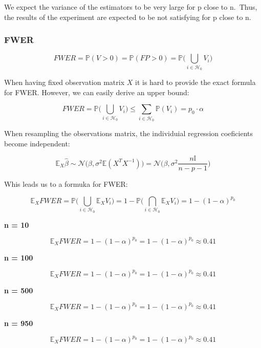 \documentclass[
]{article}
\begin{document}
We expect the variance of the estimators to be very large for p close to
n.~Thus, the results of the experiment are expected to be not satisfying
for p close to n.

\hypertarget{fwer-1}{%
\subsubsection{FWER}\label{fwer-1}}

\[FWER = \mathbb P (V > 0) = \mathbb P (FP > 0) = \mathbb P \Big(\bigcup_{i \in \mathcal H_0} V_i \Big)\]

When having fixed observation matrix \(X\) it is hard to provide the
exact formula for FWER. However, we can easily derive an upper bound:

\[FWER = \mathbb P \Big(\bigcup_{i \in \mathcal H_0} V_i \Big) \leq \sum_{i \in \mathcal H_0} \mathbb P(V_i) = p_0 \cdot \alpha\]

When resampling the observations matrix, the individuial regression
coeficients become independent:

\[\mathbb E_X \hat \beta \sim \mathcal N \big(\beta, \sigma^2 \mathbb E (X^TX^{-1})\big) = \mathcal N \big(\beta, \sigma^2 \frac {n\mathbb I}{n - p  - 1}\big) \]

Whis leads us to a formuka for FWER:

\[\mathbb E_X FWER = \mathbb P \Big(\bigcup_{i \in \mathcal H_0} \mathbb E _XV_i \Big) = 1 - \mathbb P \Big(\bigcap_{i \in \mathcal H_0} \mathbb E _XV_i \Big) = 1 - (1 - \alpha)^{p_0}\]

\textbf{n = 10}

\begin{displaymath} 
 \mathbb E_X FWER = 1 - (1 - \alpha)^{p_0} = 1 - (1 - \alpha)^{p_0} \approx 0.41
\end{displaymath}

\textbf{n = 100}

\begin{displaymath} 
 \mathbb E_X FWER = 1 - (1 - \alpha)^{p_0} = 1 - (1 - \alpha)^{p_0} \approx 0.41
\end{displaymath}

\textbf{n = 500}

\begin{displaymath} 
 \mathbb E_X FWER = 1 - (1 - \alpha)^{p_0} = 1 - (1 - \alpha)^{p_0} \approx 0.41
\end{displaymath}

\textbf{n = 950}

\begin{displaymath} 
 \mathbb E_X FWER = 1 - (1 - \alpha)^{p_0} = 1 - (1 - \alpha)^{p_0} \approx 0.41
\end{displaymath}
\end{document}
